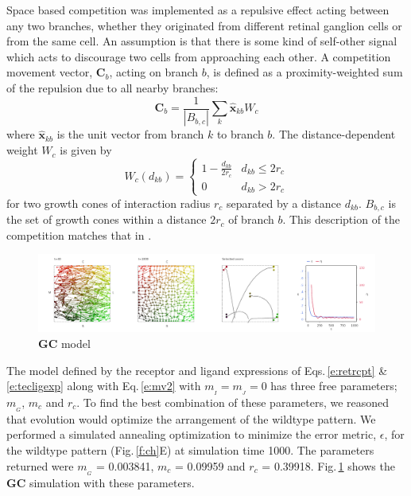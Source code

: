 \documentclass[11pt, a4paper]{article}
\begin{document}
Space based competition was implemented as a repulsive effect acting between
any two branches, whether they originated from different retinal ganglion
cells or from the same cell. An assumption is that there is some kind of
self-other signal which acts to discourage two cells from approaching each
other. A competition movement vector, $\mathbf{C}_b$, acting on branch $b$, is
defined as a proximity-weighted sum of the repulsion due to all nearby branches:
%
\begin{equation}
\mathbf{C}_b = \frac{1}{|B_{b,c}|} \sum_k \hat{\mathbf{x}}_{kb} W_c
\end{equation}
where $\hat{\mathbf{x}}_{kb}$ is the unit vector from branch $k$ to branch
$b$. The distance-dependent weight $W_c$ is given by
\begin{equation}
W_c(d_{kb}) = \begin{cases}
      1 - \frac{d_{kb}}{2r_c}   & d_{kb} \leq 2r_c \\
     0 & d_{kb} > 2r_c
     \end{cases}
\end{equation}
for two growth cones of interaction radius $r_c$ separated by a distance
$d_{kb}$. $B_{b,c}$ is the set of growth cones within a distance $2r_c$ of
branch $b$. This description of the competition matches that
in \citet{simpson_simple_2011}.

\begin{figure}
\includegraphics[width=\linewidth]{./images/j4_ee_GC_best_1_wt_figcomp1.png}
\caption{$\mathbf{GC}$ model}
\label{f:GC}
\end{figure}

The model defined by the receptor and ligand expressions of Eqs.\,\ref{e:retrcpt}
\& \ref{e:tecligexp} along with Eq.\,\ref{e:mv2} with $m_{\!_I}=m_{\!_J}=0$ has three
free parameters; $m_{\!_G}$, $m_c$ and $r_c$. To find the best combination of
these parameters, we reasoned that evolution would optimize the arrangement of
the wildtype pattern. We performed a simulated annealing optimization to
minimize the error metric, $\epsilon$, for the wildtype pattern
(Fig.\,\ref{f:ch}E) at simulation time 1000. The parameters returned were
$m_{\!_G}$ = 0.003841, $m_c$ = 0.09959 and $r_c$ = 0.39918. Fig.\,\ref{f:GC}
shows the $\mathbf{GC}$ simulation with these parameters.
\end{document}
